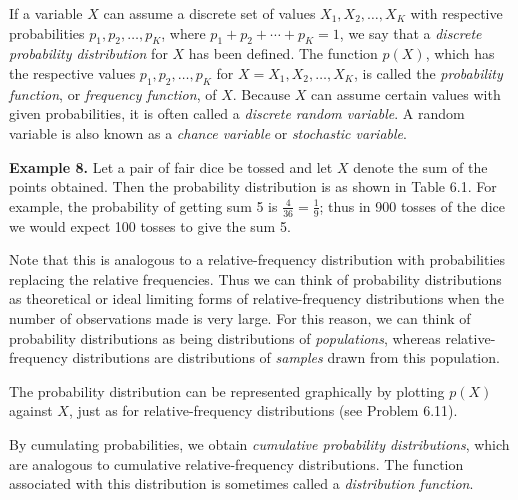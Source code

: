 \documentclass[
]{article}
\begin{document}
If a variable \(X\) can assume a discrete set of values
\(X_1, X_2, \ldots, X_K\) with respective probabilities
\(p_1, p_2, \ldots, p_K\), where \(p_1 + p_2 + \cdots + p_K = 1\), we
say that a \emph{discrete probability distribution} for \(X\) has been
defined. The function \(p(X)\), which has the respective values
\(p_1, p_2, \ldots, p_K\) for \(X = X_1, X_2, \ldots, X_K\), is called
the \emph{probability function}, or \emph{frequency function}, of \(X\).
Because \(X\) can assume certain values with given probabilities, it is
often called a \emph{discrete random variable}. A random variable is
also known as a \emph{chance variable} or \emph{stochastic variable}.

\textbf{Example 8.} Let a pair of fair dice be tossed and let \(X\)
denote the sum of the points obtained. Then the probability distribution
is as shown in Table 6.1. For example, the probability of getting sum 5
is \(\frac{4}{36} = \frac{1}{9}\); thus in 900 tosses of the dice we
would expect 100 tosses to give the sum 5.

Note that this is analogous to a relative-frequency distribution with
probabilities replacing the relative frequencies. Thus we can think of
probability distributions as theoretical or ideal limiting forms of
relative-frequency distributions when the number of observations made is
very large. For this reason, we can think of probability distributions
as being distributions of \emph{populations}, whereas relative-frequency
distributions are distributions of \emph{samples} drawn from this
population.

The probability distribution can be represented graphically by plotting
\(p(X)\) against \(X\), just as for relative-frequency distributions
(see Problem 6.11).

By cumulating probabilities, we obtain \emph{cumulative probability
distributions}, which are analogous to cumulative relative-frequency
distributions. The function associated with this distribution is
sometimes called a \emph{distribution function}.
\end{document}
